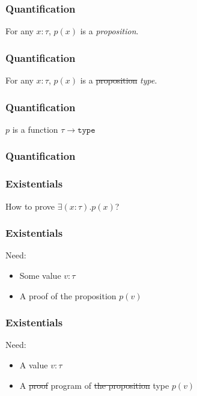 \documentclass[usenames,dvipsnames]{beamer}
\begin{document}

\begin{frame}
  \frametitle{Quantification}

  For any $x:\tau$, $p(x)$ is a \emph{proposition}.
\end{frame}


\begin{frame}
  \frametitle{Quantification}

  For any $x:\tau$, $p(x)$ is a \sout{proposition} \emph{type}.
\end{frame}


\begin{frame}
  \frametitle{Quantification}

  $p$ is a function $\tau \rightarrow \texttt{type}$
\end{frame}


\begin{frame}
  \frametitle{Quantification}
\end{frame}


\begin{frame}
  \frametitle{Existentials}

  How to prove $\exists (x:\tau).p(x)$?
\end{frame}


\begin{frame}
  \frametitle{Existentials}

  Need:
  \begin{itemize}
    \item Some value $v:\tau$
    \item A proof of the proposition $p(v)$
  \end{itemize}
\end{frame}


\begin{frame}
  \frametitle{Existentials}

  Need:
  \begin{itemize}
    \item A value $v:\tau$
    \item A \sout{proof} program of \sout{the proposition} type $p(v)$
  \end{itemize}
\end{frame}
\end{document}
